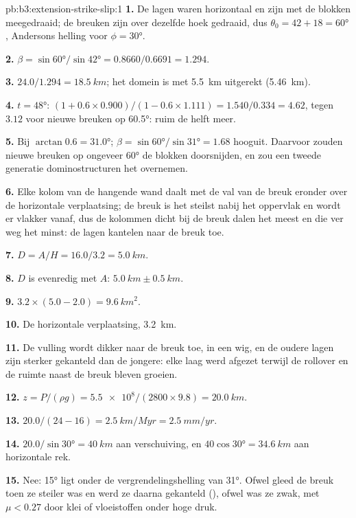 \begin{solution}{pb:b3:extension-strike-slip:1}
\textbf{1.} De lagen waren horizontaal en zijn met de blokken meegedraaid; de
breuken zijn over dezelfde hoek gedraaid, dus $\theta_0 = 42 + 18 = \ang{60}$,
Andersons helling voor $\phi = \ang{30}$.

\textbf{2.} $\beta = \sin\ang{60}/\sin\ang{42} = 0.8660/0.6691 = 1.294$.

\textbf{3.} $24.0/1.294 = \qty{18.5}{km}$; het domein is met
\qty{5.5}{km} uitgerekt (\qty{5.46}{km}).

\textbf{4.} $t = \ang{48}$: $(1 + 0.6\times0.900)/(1 - 0.6\times1.111) =
1.540/0.334 = 4.62$, tegen $3.12$ voor nieuwe breuken op \ang{60.5}: ruim
de helft meer.

\textbf{5.} Bij $\arctan0.6 = \ang{31.0}$; $\beta = \sin\ang{60}/\sin\ang{31}
= 1.68$ hooguit. Daarvoor zouden nieuwe breuken op ongeveer \ang{60} de
blokken doorsnijden, en zou een tweede generatie dominostructuren het overnemen.

\textbf{6.} Elke kolom van de hangende wand daalt met de val van de breuk
eronder over de horizontale verplaatsing; de breuk is het steilst nabij het oppervlak en wordt er
vlakker vanaf, dus de kolommen dicht bij de breuk dalen het meest en die ver weg
het minst: de lagen kantelen naar de breuk toe.

\textbf{7.} $D = A/H = 16.0/3.2 = \qty{5.0}{km}$.

\textbf{8.} $D$ is evenredig met $A$: $\qty{5.0}{km} \pm \qty{0.5}{km}$.

\textbf{9.} $3.2\times(5.0 - 2.0) = \qty{9.6}{km^2}$.

\textbf{10.} De horizontale verplaatsing, \qty{3.2}{km}.

\textbf{11.} De vulling wordt dikker naar de breuk toe, in een wig, en de oudere
lagen zijn sterker gekanteld dan de jongere: elke laag werd afgezet terwijl
de rollover en de ruimte naast de breuk bleven groeien.

\textbf{12.} $z = P/(\rho g) = \num{5.5e8}/(2800\times9.8) = \qty{20.0}{km}$.

\textbf{13.} $20.0/(24 - 16) = \qty{2.5}{km/Myr} = \qty{2.5}{mm/yr}$.

\textbf{14.} $20.0/\sin\ang{30} = \qty{40}{km}$ aan verschuiving, en $40\cos\ang{30} =
\qty{34.6}{km}$ aan horizontale rek.

\textbf{15.} Nee: \ang{15} ligt onder de vergrendelingshelling van \ang{31}. Ofwel gleed de
breuk toen ze steiler was en werd ze daarna gekanteld (), ofwel
was ze zwak, met $\mu < 0.27$ door klei of vloeistoffen onder hoge druk.


\end{solution}
